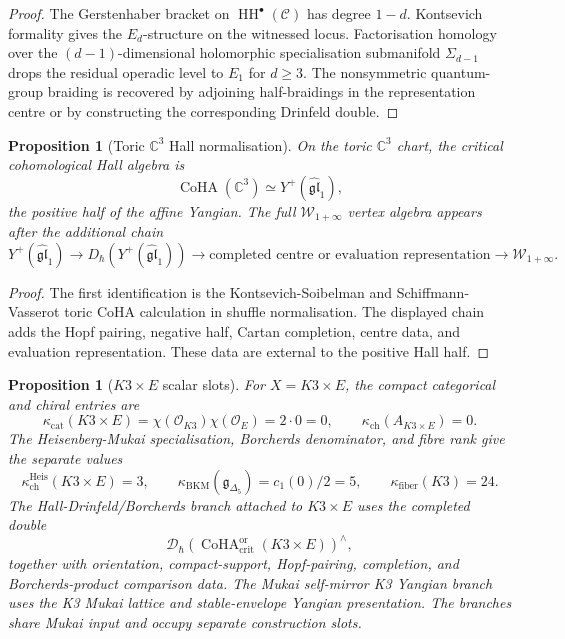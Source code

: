 \documentclass[11pt]{amsart}
\theoremstyle{plain}
\newtheorem{proposition}[theorem]{Proposition}
\theoremstyle{definition}
\theoremstyle{remark}
\providecommand{\C}{\mathbb{C}}
\providecommand{\cC}{\mathcal{C}}
\providecommand{\cO}{\mathcal{O}}
\providecommand{\fgl}{\mathfrak{gl}}
\providecommand{\HH}{\operatorname{HH}}
\providecommand{\CoHA}{\operatorname{CoHA}}
\providecommand{\Yp}{Y^{+}}
\providecommand{\Winf}{\mathcal{W}_{1+\infty}}
\begin{document}
\begin{proof}
The Gerstenhaber bracket on \(\HH^\bullet(\cC)\) has degree \(1-d\).
Kontsevich formality gives the \(E_d\)-structure on the witnessed
locus. Factorisation homology over the
\((d-1)\)-dimensional holomorphic specialisation submanifold
\(\Sigma_{d-1}\) drops the residual operadic level to \(E_1\) for
\(d\geq3\). The nonsymmetric quantum-group braiding is recovered by
adjoining half-braidings in the representation centre or by constructing
the corresponding Drinfeld double.
\end{proof}

\begin{proposition}[Toric \(\C^3\) Hall normalisation]
\label{prop:c3-hall-normalisation}
On the toric \(\C^3\) chart, the critical cohomological Hall algebra is
\[
  \CoHA(\C^3)\simeq \Yp(\widehat{\fgl}_1),
\]
the positive half of the affine Yangian. The full
\(\Winf\) vertex algebra appears after the additional chain
\[
  \Yp(\widehat{\fgl}_1)
  \longrightarrow
  D_\hbar\!\left(\Yp(\widehat{\fgl}_1)\right)
  \longrightarrow
  \text{completed centre or evaluation representation}
  \longrightarrow
  \Winf .
\]
\end{proposition}

\begin{proof}
The first identification is the Kontsevich-Soibelman and
Schiffmann-Vasserot toric CoHA calculation in shuffle normalisation.
The displayed chain adds the Hopf pairing, negative half, Cartan
completion, centre data, and evaluation representation. These data are
external to the positive Hall half.
\end{proof}

\begin{proposition}[\(K3\times E\) scalar slots]
\label{prop:k3xe-scalar-slots}
For \(X=K3\times E\), the compact categorical and chiral entries are
\[
  \kappa_{\mathrm{cat}}(K3\times E)
  =
  \chi(\cO_{K3})\chi(\cO_E)
  =
  2\cdot0
  =
  0,
  \qquad
  \kappa_{\mathrm{ch}}(A_{K3\times E})=0.
\]
The Heisenberg-Mukai specialisation, Borcherds denominator, and fibre
rank give the separate values
\[
  \kappa_{\mathrm{ch}}^{\mathrm{Heis}}(K3\times E)=3,
  \qquad
  \kappa_{\mathrm{BKM}}(\mathfrak g_{\Delta_5})=c_1(0)/2=5,
  \qquad
  \kappa_{\mathrm{fiber}}(K3)=24.
\]
The Hall-Drinfeld/Borcherds branch attached to \(K3\times E\) uses the
completed double
\[
  \mathcal D_\hbar\!\left(
    \CoHA^{\mathrm{or}}_{\mathrm{crit}}(K3\times E)
  \right)^{\wedge},
\]
together with orientation, compact-support, Hopf-pairing, completion,
and Borcherds-product comparison data. The Mukai self-mirror K3
Yangian branch uses the K3 Mukai lattice and stable-envelope Yangian
presentation. The branches share Mukai input and occupy separate
construction slots.
\end{proposition}
\end{document}
